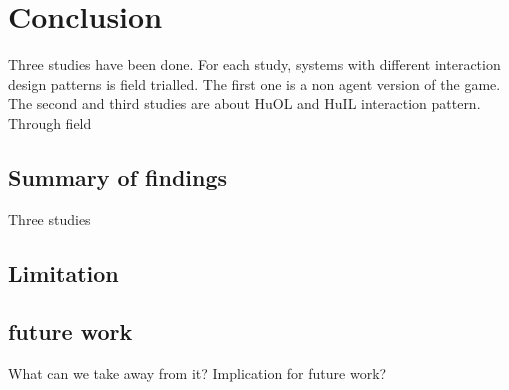 \chapter{Conclusion}
Three studies have been done. For each study, systems with different interaction design patterns is field trialled. The first one is a non agent version of the game. The second and third studies are about HuOL and HuIL interaction pattern. 
Through field 
\section{Summary of findings}
Three studies 
\section{Limitation}
\section{future work}
What can we take away from it? Implication for future work? 